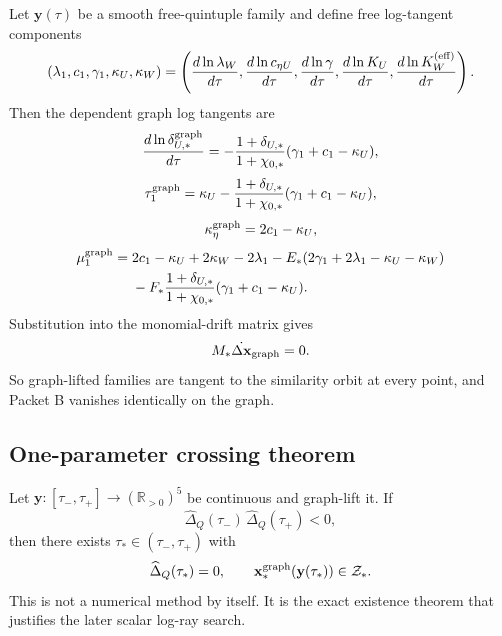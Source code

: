 Let \(\mathbf y(\tau)\) be a smooth free-quintuple family and define free log-tangent components
\begin{equation}
\label{eq:part06-free-log-tangent}
(\lambda_1,c_1,\gamma_1,\kappa_U,\kappa_W)
=
\left(
\frac{d\ln\lambda_W}{d\tau},
\frac{d\ln c_{\eta U}}{d\tau},
\frac{d\ln\gamma}{d\tau},
\frac{d\ln K_U}{d\tau},
\frac{d\ln K_W^{(\rm eff)}}{d\tau}
\right).
\end{equation}
Then the dependent graph log tangents are
\begin{equation}
\label{eq:part06-delta-graph-tangent}
\frac{d\ln\delta_{U,*}^{\rm graph}}{d\tau}
=-\frac{1+\delta_{U,*}}{1+\chi_{0,*}}(\gamma_1+c_1-\kappa_U),
\end{equation}
\begin{equation}
\label{eq:part06-T-graph-tangent}
\tau_1^{\rm graph}
=\kappa_U
-\frac{1+\delta_{U,*}}{1+\chi_{0,*}}(\gamma_1+c_1-\kappa_U),
\end{equation}
\begin{equation}
\label{eq:part06-Keta-graph-tangent}
\kappa_\eta^{\rm graph}=2c_1-\kappa_U,
\end{equation}
\begin{equation}
\label{eq:part06-mu-graph-tangent}
\begin{aligned}
\mu_1^{\rm graph}={}&
2c_1-\kappa_U+2\kappa_W-2\lambda_1
-E_*(2\gamma_1+2\lambda_1-\kappa_U-\kappa_W)\\
&-F_*\frac{1+\delta_{U,*}}{1+\chi_{0,*}}(\gamma_1+c_1-\kappa_U).
\end{aligned}
\end{equation}
Substitution into the monomial-drift matrix gives
\begin{equation}
\label{eq:part06-graph-tangent-kernel}
M_*\dot{\Delta\mathbf x}_{\rm graph}=0.
\end{equation}
So graph-lifted families are tangent to the similarity orbit at every point, and Packet B vanishes identically on the graph.

\subsection{One-parameter crossing theorem}
\label{subsec:part06-one-parameter-crossing-theorem}

Let \(\mathbf y:[\tau_-,\tau_+]\to(\mathbb R_{>0})^5\) be continuous and graph-lift it.  If
\begin{equation}
\label{eq:part06-IVT-crossing-condition}
\widehat\Delta_Q(\tau_-)\,\widehat\Delta_Q(\tau_+)<0,
\end{equation}
then there exists \(\tau_*\in(\tau_-,\tau_+)\) with
\begin{equation}
\label{eq:part06-IVT-crossing-result}
\widehat\Delta_Q(\tau_*)=0,
\qquad
\mathbf x_*^{\rm graph}(\mathbf y(\tau_*))\in\mathcal Z_*.
\end{equation}
This is not a numerical method by itself.  It is the exact existence theorem that justifies the later scalar log-ray search.

